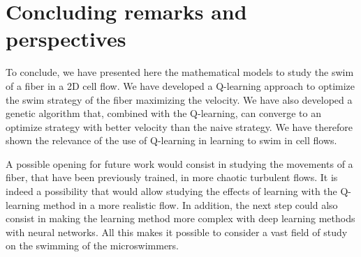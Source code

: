 \documentclass[aps,prl,preprint,groupedaddress]{revtex4-2}
\begin{document}
\section{Concluding remarks and perspectives}

To conclude, we have presented here the mathematical models to study the swim of a fiber in a 2D cell flow. We have developed a Q-learning approach to optimize the swim strategy of the fiber maximizing the velocity. We have also developed a genetic algorithm that, combined with the Q-learning, can converge to an optimize strategy with better velocity than the naive strategy. We have therefore shown the relevance of the use of Q-learning in learning to swim in cell flows.

A possible opening for future work would consist in studying the movements of a fiber, that have been previously trained, in more chaotic turbulent flows. It is indeed a possibility that would allow studying the effects of learning with the Q-learning method in a more realistic flow. In addition, the next step could also consist in making the learning method more complex with deep learning methods with neural networks. All this makes it possible to consider a vast field of study on the swimming of the microswimmers.



%


\end{document}
